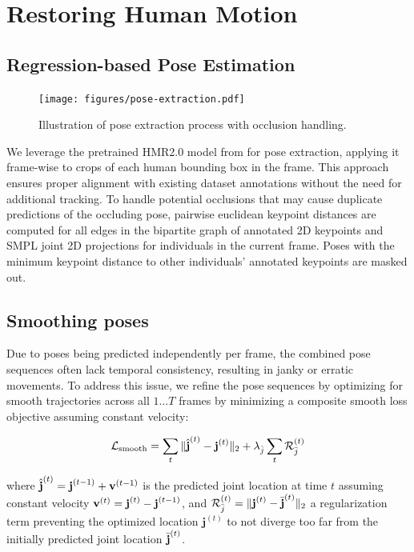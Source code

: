 \section{Restoring Human Motion}

\subsection*{Regression-based Pose Estimation} \label{section:regression-pose-estimation}
\begin{figure}[H]
    \centering
    \texttt{[image: figures/pose-extraction.pdf]}
    \caption{Illustration of pose extraction process with occlusion handling.}
    \label{fig:pose-extraction}
\end{figure}
We leverage the pretrained HMR2.0 model from \cite{goel2023humans} for pose extraction, applying it frame-wise to crops of each human bounding box in the frame. This approach ensures proper alignment with existing dataset annotations without the need for additional tracking. To handle potential occlusions that may cause duplicate predictions of the occluding pose, pairwise euclidean keypoint distances are computed for all edges in the bipartite graph of annotated 2D keypoints and SMPL joint 2D projections for individuals in the current frame. Poses with the minimum keypoint distance to other individuals' annotated keypoints are masked out.

\subsection*{Smoothing poses}
Due to poses being predicted independently per frame, the combined pose sequences often lack temporal consistency, resulting in janky or erratic movements. To address this issue, we refine the pose sequences by optimizing for smooth trajectories across all $1 \dots T$ frames by minimizing a composite smooth loss objective assuming constant velocity:

\begin{equation} \label{eq:smooth-motion}
    \mathcal{L}_\text{smooth} = \sum_t{\| \hat{\boldsymbol{\mathbf{j}}}^{(t)} - \boldsymbol{\mathbf{j}}^{(t)} \|_2} + \lambda_{\hat{j}} \sum_t{\mathcal{R}_{\bar{j}}^{(t)}}
\end{equation}

where $\hat{\boldsymbol{\mathbf{j}}}^{(t)} = \boldsymbol{\mathbf{j}}^{(t-1)} + \boldsymbol{\mathbf{v}}^{(t-1)}$ is the predicted joint location at time $t$ assuming constant velocity $\boldsymbol{\mathbf{v}}^{(t)} = \boldsymbol{\mathbf{j}}^{(t)} - \boldsymbol{\mathbf{j}}^{(t-1)}$, and $\mathcal{R}_{\bar{j}}^{(t)} = \| \boldsymbol{\mathbf{j}}^{(t)} - \bar{\boldsymbol{\mathbf{j}}}^{(t)} \|_2$ a regularization term preventing the optimized location $\mathbf{j}^{(t)}$ to not diverge too far from the initially predicted joint location $\bar{\boldsymbol{\mathbf{j}}}^{(t)}$.


